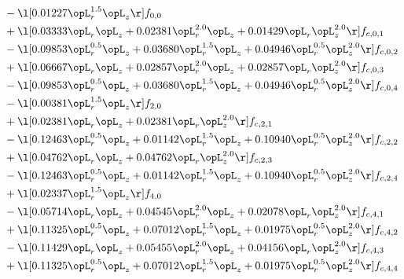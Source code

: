 \begin{alignat}{2}
& - \l[  0.01227 \opL_r^{1.5} \opL_z  \r] f_{0,0} \nonumber \\ 
& + \l[  0.03333 \opL_r \opL_z +  0.02381 \opL_r^{2.0} \opL_z +  0.01429 \opL_r \opL_z^{2.0}  \r] f_{c,0,1} \nonumber \\ 
& - \l[  0.09853 \opL_r^{0.5} \opL_z +  0.03680 \opL_r^{1.5} \opL_z +  0.04946 \opL_r^{0.5} \opL_z^{2.0}  \r] f_{c,0,2} \nonumber \\ 
& + \l[  0.06667 \opL_r \opL_z +  0.02857 \opL_r^{2.0} \opL_z +  0.02857 \opL_r \opL_z^{2.0}  \r] f_{c,0,3} \nonumber \\ 
& - \l[  0.09853 \opL_r^{0.5} \opL_z +  0.03680 \opL_r^{1.5} \opL_z +  0.04946 \opL_r^{0.5} \opL_z^{2.0}  \r] f_{c,0,4} \nonumber \\ 
& - \l[  0.00381 \opL_r^{1.5} \opL_z  \r] f_{2,0} \nonumber \\ 
& + \l[  0.02381 \opL_r \opL_z +  0.02381 \opL_r \opL_z^{2.0}  \r] f_{c,2,1} \nonumber \\ 
& - \l[  0.12463 \opL_r^{0.5} \opL_z +  0.01142 \opL_r^{1.5} \opL_z +  0.10940 \opL_r^{0.5} \opL_z^{2.0}  \r] f_{c,2,2} \nonumber \\ 
& + \l[  0.04762 \opL_r \opL_z +  0.04762 \opL_r \opL_z^{2.0}  \r] f_{c,2,3} \nonumber \\ 
& - \l[  0.12463 \opL_r^{0.5} \opL_z +  0.01142 \opL_r^{1.5} \opL_z +  0.10940 \opL_r^{0.5} \opL_z^{2.0}  \r] f_{c,2,4} \nonumber \\ 
& + \l[  0.02337 \opL_r^{1.5} \opL_z  \r] f_{4,0} \nonumber \\ 
& - \l[  0.05714 \opL_r \opL_z +  0.04545 \opL_r^{2.0} \opL_z +  0.02078 \opL_r \opL_z^{2.0}  \r] f_{c,4,1} \nonumber \\ 
& + \l[  0.11325 \opL_r^{0.5} \opL_z +  0.07012 \opL_r^{1.5} \opL_z +  0.01975 \opL_r^{0.5} \opL_z^{2.0}  \r] f_{c,4,2} \nonumber \\ 
& - \l[  0.11429 \opL_r \opL_z +  0.05455 \opL_r^{2.0} \opL_z +  0.04156 \opL_r \opL_z^{2.0}  \r] f_{c,4,3} \nonumber \\ 
& + \l[  0.11325 \opL_r^{0.5} \opL_z +  0.07012 \opL_r^{1.5} \opL_z +  0.01975 \opL_r^{0.5} \opL_z^{2.0}  \r] f_{c,4,4} \nonumber \\ 
\end{alignat} 



